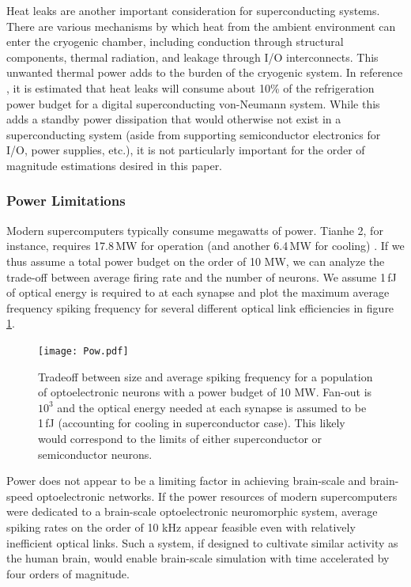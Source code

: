\documentclass[twocolumn]{article}
\begin{document}
Heat leaks are another important consideration for superconducting systems. There are various mechanisms by which heat from the ambient environment can enter the cryogenic chamber, including conduction through structural components, thermal radiation, and leakage through I/O interconnects. This unwanted thermal power adds to the burden of the cryogenic system. In reference \cite{holmes2013energy}, it is estimated that heat leaks will consume about 10\% of the refrigeration power budget for a digital superconducting von-Neumann system. While this adds a standby power dissipation that would otherwise not exist in a superconducting system (aside from supporting semiconductor electronics for I/O, power supplies, etc.), it is not particularly important for the order of magnitude estimations desired in this paper.

\subsubsection{Power Limitations}
Modern supercomputers typically consume megawatts of power. Tianhe 2, for instance, requires 17.8\,MW for operation (and another 6.4\,MW for cooling) \cite{tolpygo2016superconductor}. If we thus assume a total power budget on the order of 10 MW, we can analyze the trade-off between average firing rate and the number of neurons. We assume 1\,fJ of optical energy is required to at each synapse and plot the maximum average frequency spiking frequency for several different optical link efficiencies in figure \ref{fig:freq_size}.

\begin{figure}[H]
    \centering
    \texttt{[image: Pow.pdf]}
    \caption{Tradeoff between size and average spiking frequency for a population of optoelectronic neurons with a power budget of 10 MW. Fan-out is $10^3$ and the optical energy needed at each synapse is assumed to be 1\,fJ (accounting for cooling in superconductor case). This likely would correspond to the limits of either superconductor or semiconductor neurons.}
    \label{fig:freq_size}
\end{figure}

Power does not appear to be a limiting factor in achieving brain-scale and brain-speed optoelectronic networks. If the power resources of modern supercomputers were dedicated to a brain-scale optoelectronic neuromorphic system, average spiking rates on the order of 10 kHz appear feasible even with relatively inefficient optical links. Such a system, if designed to cultivate similar activity as the human brain, would enable brain-scale simulation with time accelerated by four orders of magnitude.
\end{document}
